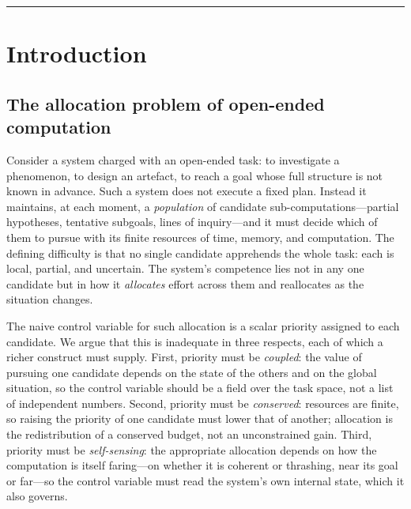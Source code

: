 \documentclass[11pt,a4paper]{article}
\theoremstyle{plain}
\theoremstyle{definition}
\theoremstyle{remark}
\begin{document}
\begin{abstract}
\medskip
\noindent\textbf{Keywords:} sentiment field, resource allocation, replicator
dynamics, maximum entropy, homeostasis, interoception, synchronization,
variational principle, gradient flow, attention economy.
\end{abstract}

\tableofcontents
\bigskip\hrule

\section{Introduction}
\label{sec:intro}

\subsection{The allocation problem of open-ended computation}

Consider a system charged with an open-ended task: to investigate a phenomenon,
to design an artefact, to reach a goal whose full structure is not known in
advance. Such a system does not execute a fixed plan. Instead it maintains, at
each moment, a \emph{population} of candidate sub-computations---partial
hypotheses, tentative subgoals, lines of inquiry---and it must decide which of
them to pursue with its finite resources of time, memory, and computation. The
defining difficulty is that no single candidate apprehends the whole task: each
is local, partial, and uncertain. The system's competence lies not in any one
candidate but in how it \emph{allocates} effort across them and reallocates as
the situation changes.

The naive control variable for such allocation is a scalar priority assigned to
each candidate. We argue that this is inadequate in three respects, each of
which a richer construct must supply. First, priority must be \emph{coupled}:
the value of pursuing one candidate depends on the state of the others and on
the global situation, so the control variable should be a field over the task
space, not a list of independent numbers. Second, priority must be
\emph{conserved}: resources are finite, so raising the priority of one candidate
must lower that of another; allocation is the redistribution of a conserved
budget, not an unconstrained gain. Third, priority must be \emph{self-sensing}:
the appropriate allocation depends on how the computation is itself faring---on
whether it is coherent or thrashing, near its goal or far---so the control
variable must read the system's own internal state, which it also governs.
\end{document}
